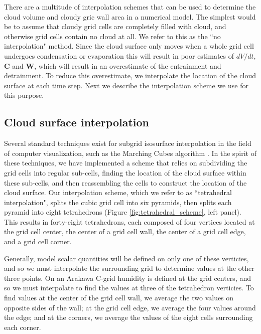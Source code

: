 \documentclass[12pt]{article}
\begin{document}
There are a multitude of interpolation schemes that can be used to determine 
the cloud volume and cloudy gric wall area in a numerical model.  The simplest 
would be to assume that cloudy grid cells are completely filled with cloud, 
and otherwise grid cells contain no cloud at all.  We refer to this as the ``no 
interpolation" method.  Since the cloud surface only moves when a whole grid 
cell undergoes condensation or evaporation this will result in poor estimates 
of $dV/dt$, $\mathbf{C}$ and $\mathbf{W}$, which will result in an overestimate 
of the entrainment and detrainment.  To reduce this overestimate, we 
interpolate the location of the cloud surface at each time step.  Next we 
describe the interpolation scheme we use for this purpose.


\subsection{Cloud surface interpolation}

Several standard techniques exist for subgrid isosurface interpolation in the 
field of computer visualization, such as the Marching Cubes algorithm 
\citep{Lorensen1987}.  In the spirit of these techniques, we have implemented 
a scheme that relies on subdividing the grid cells into regular sub-cells, 
finding the location of the cloud surface within these sub-cells, and then 
reassembling the cells to construct the location of the cloud surface.  Our 
interpolation scheme, which we refer to as ``tetrahedral interpolation", splits 
the cubic grid cell into six pyramids, then splits each pyramid into eight 
tetrahedrons (Figure \ref{fig:tetrahedral_scheme}, left panel).  This results in
forty-eight tetrahedrons, each composed of four vertices located at the grid 
cell center, the center of a grid cell wall, the center of a grid cell edge, 
and a grid cell corner.

Generally, model scalar quantities will be defined on only one of these 
verticies, and so we must interpolate the surrounding grid to determine 
values at the other three points.  On an Arakawa C-grid humidity is defined 
at the grid centers, and so we must interpolate to find the values at three 
of the tetrahedron verticies.  To find values at the center of the grid cell 
wall, we average the two values on opposite sides of the wall; at the grid 
cell edge, we average the four values around the edge; and at the corners, 
we average the values of the eight cells surrounding each corner.
\end{document}
